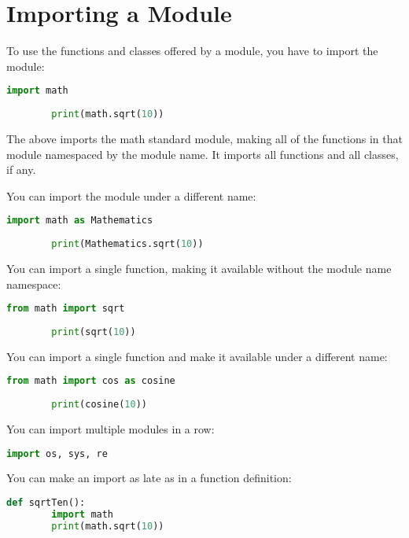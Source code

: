 \documentclass{article}
\begin{document}
	

	
	\section{Importing a Module}
	
	To use the functions and classes offered by a module, you have to import the module:
	
	\begin{lstlisting}[language=Python]
		import math
		
		print(math.sqrt(10))
	\end{lstlisting}
	
	The above imports the math standard module, making all of the functions in that module namespaced by the module name. It imports all functions and all classes, if any.
	
	You can import the module under a different name:
	
	\begin{lstlisting}[language=Python]
		import math as Mathematics
		
		print(Mathematics.sqrt(10))
	\end{lstlisting}
	
	You can import a single function, making it available without the module name namespace:
	
	\begin{lstlisting}[language=Python]
		from math import sqrt
		
		print(sqrt(10))
	\end{lstlisting}
	
	You can import a single function and make it available under a different name:
	
	\begin{lstlisting}[language=Python]
		from math import cos as cosine
		
		print(cosine(10))
	\end{lstlisting}
	
	You can import multiple modules in a row:
	
	\begin{lstlisting}[language=Python]
		import os, sys, re
	\end{lstlisting}
	
	You can make an import as late as in a function definition:
	
	\begin{lstlisting}[language=Python]
		def sqrtTen():
		import math
		print(math.sqrt(10))
	\end{lstlisting}
	
\end{document}
